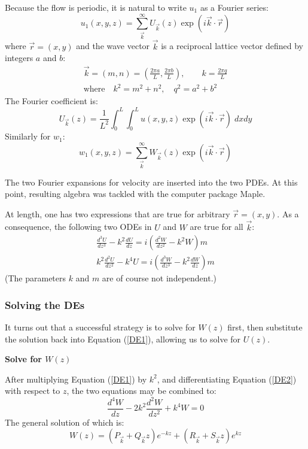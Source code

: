 \documentclass[12pt, a4paper, twoside, openright]{book}
\begin{document}
Because the flow is periodic, it is natural to write $u_1$ as a Fourier series:
\begin{equation}
u_1(x,y,z) = \sum_{\vec{k}}^{\infty} U_{\vec{k}}(z) \exp(i \vec{k}\cdot \vec{r})
\end{equation}
where $\vec{r} = (x,y)$ and the wave vector $\vec{k}$ is a reciprocal lattice vector defined by integers $a$ and $b$:
\begin{gather}
\vec{k} = (m,n) = \left( \frac{ 2\pi a }{L} , \frac{ 2\pi b }{L}  \right),
 \qquad k = \frac{2 \pi q}{L} \\
\text{where} \quad k^2 = m^2 + n^2,  \quad  q^2 = a^2 + b^2
\end{gather}
The Fourier coefficient is:
\begin{equation}
U_{\vec{k}}(z) = \frac{1}{L^2} \int_0^L \int_0^L u(x,y,z) \exp(i \vec{k} \cdot \vec{r})
\;dxdy
\end{equation}
Similarly for $w_1$:
\begin{equation}
w_1(x,y,z) = \sum_{\vec{k}}^{\infty} W_{\vec{k}}(z) \exp(i \vec{k}\cdot \vec{r})
\end{equation}

The two Fourier expansions for velocity are inserted into the two PDEs.  At this point, resulting algebra was tackled with the computer package Maple.

At length, one has two expressions that are true for arbitrary $\vec{r} = (x,y)$.  As a consequence, the following two ODEs in $U$ and $W$ are true for all $\vec{k}$:
\begin{gather}
\frac{d^3 U}{dz^3} - k^2 \frac{d U}{dz} = i \left( \frac{d^2 W}{dz^2} - k^2 W \right) m 
\label{DE1} \\
k^2 \frac{d^2 U}{dz^2} - k^4 U = i \left( \frac{d^3 W}{dz^3} - k^2 \frac{dW}{dz} \right) m
\label{DE2}
\end{gather}
(The parameters $k$ and $m$ are of course not independent.)

\subsubsection{Solving the DEs}

It turns out that a successful strategy is to solve for $W(z)$ first, then substitute the solution back into Equation (\ref{DE1}), allowing us to solve for $U(z)$.

\vspace{1em}
\textbf{Solve for $W(z)$}

After multiplying Equation (\ref{DE1}) by $k^2$, and  differentiating  Equation (\ref{DE2}) with respect to $z$, the two equations may be combined to:
\begin{equation}
\frac{d^4 W}{dz} - 2 k^2 \frac{d^2 W}{dz^2} + k^4 W = 0
\end{equation}
The general solution of which is:
\begin{equation}
W(z) = \left( P_{\vec{k}} + Q_{\vec{k}} z \right) e^{-kz} +
\left( R_{\vec{k}} + S_{\vec{k}} z \right) e^{kz}
\end{equation}
\end{document}
